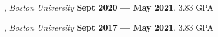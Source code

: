 
, \textit{Boston University}	\hfill {\bfseries Sept 2020 --- May 2021}, 3.83 GPA

, \textit{Boston University} \hfill	{\bfseries Sept 2017 --- May 2021}, 3.83 GPA


